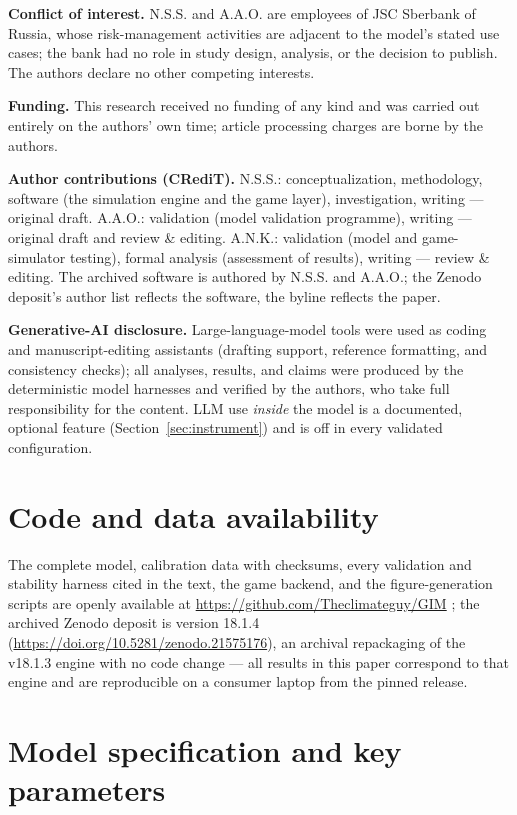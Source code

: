 \documentclass[a4paper,fleqn]{cas-sc}
\begin{document}
\textbf{Conflict of interest.} N.S.S. and A.A.O. are employees of JSC Sberbank of Russia, whose
risk-management activities are adjacent to the model's stated use cases; the bank had no role in
study design, analysis, or the decision to publish. The authors declare no other competing
interests.

\textbf{Funding.} This research received no funding of any kind and was carried out entirely on
the authors' own time; article processing charges are borne by the authors.

\textbf{Author contributions (CRediT).} N.S.S.: conceptualization, methodology, software (the
simulation engine and the game layer), investigation, writing --- original draft. A.A.O.:
validation (model validation programme), writing --- original draft and review \& editing.
A.N.K.: validation (model and game-simulator testing), formal analysis (assessment of results),
writing --- review \& editing. The archived software is authored by N.S.S. and A.A.O.; the
Zenodo deposit's author list reflects the software, the byline reflects the paper.

\textbf{Generative-AI disclosure.} Large-language-model tools were used as coding and
manuscript-editing assistants (drafting support, reference formatting, and consistency checks);
all analyses, results, and claims were produced by the deterministic model harnesses and
verified by the authors, who take full responsibility for the content. LLM use \emph{inside}
the model is a documented, optional feature (Section~\ref{sec:instrument}) and is off in every
validated configuration.

\section*{Code and data availability}
The complete model, calibration data with checksums, every validation and stability harness
cited in the text, the game backend, and the figure-generation scripts are openly available at
\url{https://github.com/Theclimateguy/GIM} \citep{theclimateguy2026gim}; the archived Zenodo
deposit is version 18.1.4 (\url{https://doi.org/10.5281/zenodo.21575176}), an archival
repackaging of the v18.1.3 engine with no code change --- all results in this paper correspond
to that engine and are reproducible on a consumer laptop from the pinned release.

\clearpage
\appendix
\section{Model specification and key parameters}
\label{app:spec}
\end{document}
